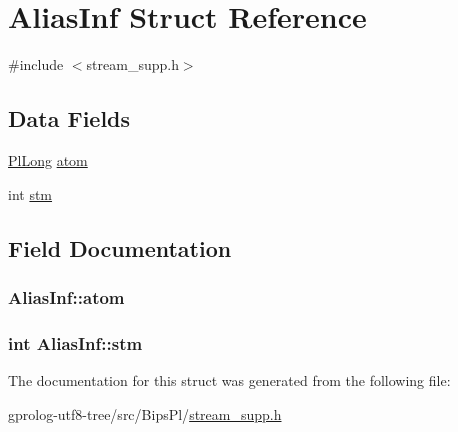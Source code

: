 \hypertarget{structAliasInf}{}\section{Alias\+Inf Struct Reference}
\label{structAliasInf}


{\ttfamily \#include $<$stream\+\_\+supp.\+h$>$}

\subsection*{Data Fields}
\begin{DoxyCompactItemize}
\item 
\hyperlink{gprolog_8h_a4d005b136d7fb28537eb1815f7868b63}{Pl\+Long} \hyperlink{structAliasInf_aa0eddd23c6a16d2a76eecc569dbd34d1}{atom}
\item 
int \hyperlink{structAliasInf_aff64cf68f3f548a6978aa01f8509cc9c}{stm}
\end{DoxyCompactItemize}


\subsection{Field Documentation}
\subsubsection[{\texorpdfstring{atom}{atom}}]{ Alias\+Inf\+::atom}\hypertarget{structAliasInf_aa0eddd23c6a16d2a76eecc569dbd34d1}{}\label{structAliasInf_aa0eddd23c6a16d2a76eecc569dbd34d1}
\subsubsection[{\texorpdfstring{stm}{stm}}]{\setlength{\rightskip}{0pt plus 5cm}int Alias\+Inf\+::stm}\hypertarget{structAliasInf_aff64cf68f3f548a6978aa01f8509cc9c}{}\label{structAliasInf_aff64cf68f3f548a6978aa01f8509cc9c}


The documentation for this struct was generated from the following file\+:\begin{DoxyCompactItemize}
\item 
gprolog-\/utf8-\/tree/src/\+Bips\+Pl/\hyperlink{stream__supp_8h}{stream\+\_\+supp.\+h}\end{DoxyCompactItemize}
